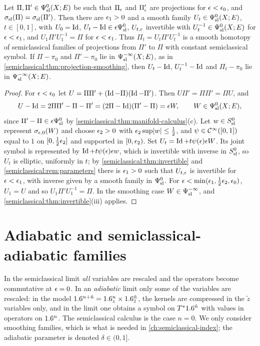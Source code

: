 \begin{proposition}\label{semiclassical:prop:projection-homotopy}
  Let $\Pi,\Pi'\in\Psi^{0}_{\mathrm{sl}}(X;E)$ be such that $\Pi_\epsilon$ and $\Pi'_\epsilon$ are projections
  for $\epsilon<\epsilon_0$, and $\sigma_{\mathrm{sl}}(\Pi)=\sigma_{\mathrm{sl}}(\Pi')$. Then there are $\epsilon_1>0$ and a smooth
  family $U_t\in\Psi^{0}_{\mathrm{sl}}(X;E)$, $t\in[0,1]$, with $U_0=\operatorname{Id}$, $U_t-\operatorname{Id}\in\epsilon\Psi^{0}_{\mathrm{sl}}$,
  $U_{t,\epsilon}$ invertible with $U_t^{-1}\in\Psi^{0}_{\mathrm{sl}}(X;E)$ for $\epsilon<\epsilon_1$, and
  $U_1\Pi'U_1^{-1}=\Pi$ for $\epsilon<\epsilon_1$. Thus $\Pi_t=U_t\Pi'U_t^{-1}$ is a smooth
  homotopy of semiclassical families of projections from $\Pi'$ to $\Pi$ with constant
  semiclassical symbol. If $\Pi-\pi_0$ and $\Pi'-\pi_0$ lie in $\Psi^{-\infty}_{\mathrm{sl}}(X;E)$, as in
  \cref{semiclassical:thm:projection-smoothing}, then $U_t-\operatorname{Id}$, $U_t^{-1}-\operatorname{Id}$ and
  $\Pi_t-\pi_0$ lie in $\Psi^{-\infty}_{\mathrm{sl}}(X;E)$.
\end{proposition}
\begin{proof}
  For $\epsilon<\epsilon_0$ let $U=\Pi\Pi'+(\operatorname{Id}-\Pi)(\operatorname{Id}-\Pi')$. Then
  $U\Pi'=\Pi\Pi'=\Pi U$, and
  \begin{equation*}
    U-\operatorname{Id}=2\Pi\Pi'-\Pi-\Pi'=(2\Pi-\operatorname{Id})(\Pi'-\Pi)=\epsilon W,\qquad W\in\Psi^{0}_{\mathrm{sl}}(X;E),
  \end{equation*}
  since $\Pi'-\Pi\in\epsilon\Psi^{0}_{\mathrm{sl}}$ by \cref{semiclassical:thm:manifold-calculus}(c). Let
  $w\in S^{0}_{\mathrm{sl}}$ represent $\sigma_{\epsilon,0}(W)$ and choose $\epsilon_2>0$ with
  $\epsilon_2\sup\lvert w\rvert\le\frac12$, and $\psi\in\mathcal{C}^\infty([0,1])$ equal to $1$ on $[0,\frac12\epsilon_2]$
  and supported in $[0,\epsilon_2)$. Set $U_t=\operatorname{Id}+t\psi(\epsilon)\epsilon W$. Its joint symbol is
  represented by $\operatorname{Id}+t\psi(\epsilon)\epsilon w$, which is invertible with inverse in $S^{0}_{\mathrm{sl}}$, so
  $U_t$ is elliptic, uniformly in $t$; by \cref{semiclassical:thm:invertible} and
  \cref{semiclassical:rem:parameters} there is $\epsilon_1>0$ such that $U_{t,\epsilon}$ is
  invertible for $\epsilon<\epsilon_1$, with inverse given by a smooth family in $\Psi^{0}_{\mathrm{sl}}$. For
  $\epsilon<\min(\epsilon_1,\frac12\epsilon_2,\epsilon_0)$, $U_1=U$ and so $U_1\Pi'U_1^{-1}=\Pi$. In the
  smoothing case $W\in\Psi^{-\infty}_{\mathrm{sl}}$, and \cref{semiclassical:thm:invertible}(iii)
  applies.
\end{proof}

\section{Adiabatic and semiclassical-adiabatic families}\label{semiclassical:sec:adiabatic}

In the semiclassical limit \emph{all} variables are rescaled and the
operators become commutative at $\epsilon=0$. In an \emph{adiabatic} limit only some of
the variables are rescaled: in the model $1.6^{n+\tilde n}=1.6^n_z\times1.6^{\tilde n}_{\tilde z}$,
the kernels are compressed in the $\tilde z$ variables only, and in the limit one
obtains a symbol on $T^*1.6^{\tilde n}$ with values in operators on $1.6^n$. The
semiclassical calculus is the case $n=0$. We only consider smoothing families, which
is what is needed in \cref{ch:semiclassical-index}; the adiabatic parameter is
denoted $\delta\in(0,1]$.

